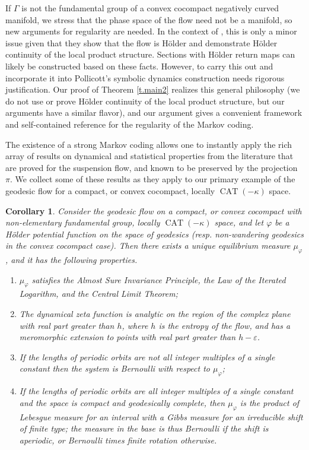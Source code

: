 \documentclass[JEP,XML,SOM,Unicode,NoFloatCountersInSection]{cedram}
\let\epsilon\varepsilon
\newtheorem{corx}[thmx]{Corollary}
\theoremstyle{definition}
\numberwithin{equation}{section}
\DeclareMathOperator{\CAT}{CAT}
\begin{document}
If $\Gamma$ is not the fundamental group of a convex cocompact negatively curved manifold, we stress that the phase space of the flow need not be a manifold, so new arguments for regularity are needed. In the context of \cite{bcls}, this is only a minor issue given that they show that the flow is Hölder and demonstrate Hölder continuity of the local product structure. Sections with Hölder return maps can likely be constructed based on these facts. However, to carry this out and incorporate it into Pollicott's symbolic dynamics construction needs rigorous justification. Our proof of Theorem \ref{t.main2} realizes this general philosophy (we do not use or prove Hölder continuity of the local product structure, but our arguments have a similar flavor), and our argument gives a convenient framework and self-contained reference for the regularity of the Markov coding.

The existence of a strong Markov coding allows one to instantly apply the rich array of results on dynamical and statistical properties from the literature that are proved for the suspension flow, and known to be preserved by the projection $\pi$. We collect some of these results as they apply to our primary example of the geodesic flow for a compact, or convex cocompact, locally $\CAT(-\kappa)$ space.

\begin{corx}\label{t.applications}
Consider the geodesic flow on a compact, or convex cocompact with non-elementary fundamental group, locally $\CAT(-\kappa)$ space, and let $\varphi$ be a Hölder potential function on the space of geodesics (resp. non-wandering geodesics in the convex cocompact case). Then there exists a unique equilibrium measure $\mu_\varphi$, and it has the following properties.
\begin{enumerate}
\item\label{t.applications1} $\mu_\varphi$ satisfies the Almost Sure Invariance Principle, the Law of the Iterated Logarithm, and the Central Limit Theorem;
\item\label{t.applications2} The dynamical zeta function is analytic on the region of the complex plane with real part greater than $h$, where $h$ is the entropy of the flow, and has a meromorphic extension to points with real part greater than $h- \epsilon$.
\item\label{t.applications3} If the lengths of periodic orbits are not all integer multiples of a single constant then the system is Bernoulli with respect to $\mu_\varphi$;
\item\label{t.applications4} If the lengths of periodic orbits are all integer multiples of a single constant and the space is compact and geodesically complete, then $\mu_\varphi$ is the product of Lebesgue measure for an interval with a Gibbs measure for an irreducible shift of finite type; the measure in the base is thus Bernoulli if the shift is aperiodic, or Bernoulli times finite rotation otherwise.
\end{enumerate}
\end{corx}
\end{document}
